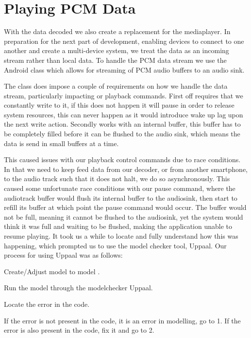 \section{Playing \acs{PCM} Data}
With the data decoded we also create a replacement for the mediaplayer.
In preparation for the next part of development, enabling devices to connect to one another and create a multi-device system, we treat the data as an incoming stream rather than local data.
To handle the \ac{PCM} data stream we use the Android class  which allows for streaming of PCM audio buffers to an audio sink.

The  class does impose a couple of requirements on how we handle the data stream, particularly impacting or playback commands.
First off  requires that we constantly write to it, if this does not happen it will pause in order to release system resources, this can never happen as it would introduce wake up lag upon the next write action.
Secondly  works with an internal buffer, this buffer has to be completely filled before it can be flushed to the audio sink, which means the data is send in small buffers at a time.\cite{audiotrack}

This caused issues with our playback control commands due to race conditions.
In that we need to keep feed data from our decoder, or from another smartphone, to the audio track such that it does not halt, we do so asynchronously.
This caused some unfortunate race conditions with our pause command, where the audiotrack buffer would flush its internal buffer to the audiosink, then start to refill its buffer at which point the pause command would occur.
The buffer would not be full, meaning it cannot be flushed to the audiosink, yet the system would think it was full and waiting to be flushed, making the application unable to resume playing.
It took us a while to locate and fully understand how this was happening, which prompted us to use the model checker tool, Uppaal.
Our process for using Uppaal was as follows:
\begin{enumberate}
    \item Create/Adjust model to model .
    \item Run the model through the modelchecker Uppaal.
    \item Locate the error in the code.
    \item If the error is not present in the code, it is an error in modelling, go to 1. If the error is also present in the code, fix it and go to 2.
\end{enumberate}


